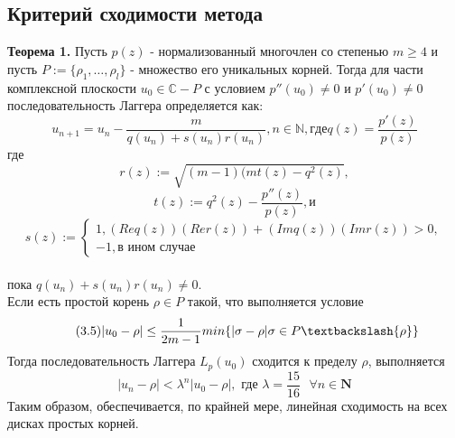 \documentclass[a4paper,12pt]{article}
\begin{document}
\subsection{Критерий сходимости метода}
\textbf{Теорема 1.} Пусть $p(z)$ - нормализованный многочлен со степенью $m \geq 4$ и пусть $P:=\{ \rho_1,\dots,\rho_l\}$ - множество его уникальных корней. Тогда для части комплексной плоскости $u_0 \in \mathbb{C} - P$ с условием $p''(u_0) \neq 0$ и $p'(u_0) \neq 0$ последовательность Лаггера определяется как:
\begin{equation} \tag{3.1}
u_{n+1}=u_n-\frac{m}{q(u_n)+s(u_n)r(u_n)}, n \in \mathbb{N}, где q(z)=\frac{p'(z)}{p(z)}
\end{equation}
где
\begin{equation} \tag{3.2}
r(z):=\sqrt{(m-1)(mt(z)-q^2(z)},
\end{equation}
\begin{equation} \tag{3.3}
t(z):=q^2(z)-\frac{p''(z)}{p(z)}, \text{и}
\end{equation}
\begin{equation} \tag{3.4}
  s(z):=
  \begin{cases}
    1, (Re q(z))(Re r(z)) + (Im q(z))(Im r(z)) > 0, \\
    -1, \text{в ином случае}
  \end{cases}
\end{equation} \\
пока $q(u_n) + s(u_n)r(u_n) \neq 0$. \\
Если есть простой корень $\rho \in P$ такой, что выполняется условие
\begin{equation} \tag{3.5}
|u_0-\rho| \leq \frac{1}{2m-1}min \{ |\sigma - \rho|\sigma \in P \textbackslash \{ \rho \}\}    
\end{equation}
Тогда последовательность Лаггера $L_p(u_0)$ сходится к пределу $\rho$, выполняется
\begin{equation} \tag{3.6}
|u_n-\rho| < \lambda ^ n |u_0-\rho|, \text{ где } \lambda = \frac{15}{16} \text{ } \forall n \in \textbf{N}  
\end{equation}
Таким образом, обеспечивается, по крайней мере, линейная сходимость на всех дисках простых корней. \\\\
\end{document}
